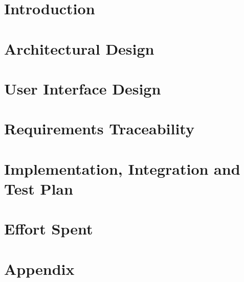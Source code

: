 \documentclass[a4paper,12pt]{report}
\begin{document}
\setcounter{tocdepth}{1}
\tableofcontents

\chapter{Introduction}

\clearpage

\chapter{Architectural Design}

\clearpage

\chapter{User Interface Design}
\clearpage

\chapter{Requirements Traceability}
\clearpage

\chapter{Implementation, Integration and Test Plan}
\clearpage

\chapter{Effort Spent}

\clearpage

\appendix
\chapter{Appendix}



\end{document}
